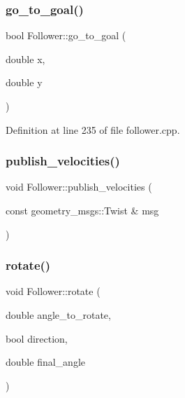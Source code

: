 \mbox{\label{class_follower_a08ab05cb32f0e6653939163dd22f344a}} 
\subsubsection{\texorpdfstring{go\+\_\+to\+\_\+goal()}{go\_to\_goal()}}
{\footnotesize\ttfamily bool Follower\+::go\+\_\+to\+\_\+goal (\begin{DoxyParamCaption}\item[{double}]{x,  }\item[{double}]{y }\end{DoxyParamCaption})}



Definition at line 235 of file follower.\+cpp.

\mbox{\label{class_follower_aaae1600959a929c269d557d9c09ba777}} 
\subsubsection{\texorpdfstring{publish\+\_\+velocities()}{publish\_velocities()}}
{\footnotesize\ttfamily void Follower\+::publish\+\_\+velocities (\begin{DoxyParamCaption}\item[{const geometry\+\_\+msgs\+::\+Twist \&}]{msg }\end{DoxyParamCaption})}

\mbox{\label{class_follower_abf8ec0da50295140bf750d30906a726b}} 
\subsubsection{\texorpdfstring{rotate()}{rotate()}}
{\footnotesize\ttfamily void Follower\+::rotate (\begin{DoxyParamCaption}\item[{double}]{angle\+\_\+to\+\_\+rotate,  }\item[{bool}]{direction,  }\item[{double}]{final\+\_\+angle }\end{DoxyParamCaption})}



